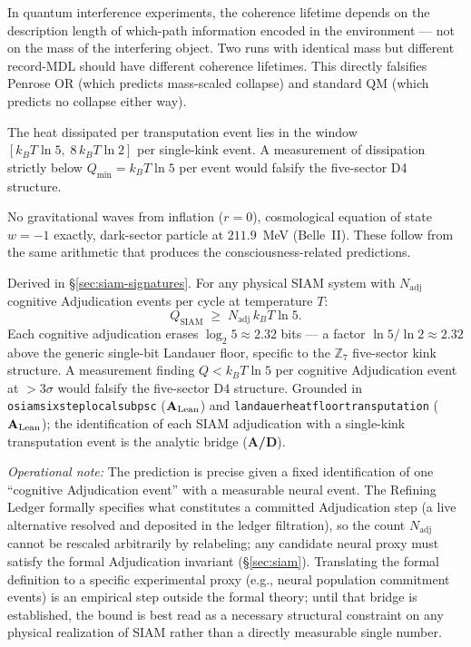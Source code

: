 \documentclass[11pt]{article}
\theoremstyle{remark}
\newcommand{\lean}[1]{%
  \penalty-100
  \begingroup\def\_{\textunderscore\allowbreak}\texttt{#1}\endgroup}
\newcommand{\CatAL}{\ensuremath{\textbf{A}_{\rm Lean}}}
\newcommand{\CatAD}{\textbf{A/D}}
\begin{document}
\medskip
\begin{termlist}
  \item[Coherence lifetime vs.\ MDL record length]
    In quantum interference experiments, the coherence lifetime depends on the
    description length of which-path information encoded in the environment --- not
    on the mass of the interfering object. Two runs with identical mass but different
    record-MDL should have different coherence lifetimes. This directly falsifies
    Penrose OR (which predicts mass-scaled collapse) and standard QM (which predicts
    no collapse either way).

  \item[Transputation dissipation window]
    The heat dissipated per transputation event lies in the window
    $[k_B T \ln 5,\; 8\, k_B T \ln 2]$ per single-kink event. A measurement
    of dissipation strictly below $Q_{\min} = k_B T \ln 5$ per event would
    falsify the five-sector D4 structure.

  \item[Cosmological and particle predictions]
    No gravitational waves from inflation ($r = 0$), cosmological equation of state
    $w = -1$ exactly, dark-sector particle at $211.9$~MeV (Belle~II). These follow
    from the same arithmetic that produces the consciousness-related predictions.

  \item[SIAM aggregate Landauer floor (\CatAD)]
    Derived in \S\ref{sec:siam-signatures}. For any physical SIAM system with
    $N_\text{adj}$ cognitive Adjudication events per cycle at temperature $T$:
    \[
      Q_\text{SIAM} \;\geq\; N_\text{adj}\, k_B T \ln 5.
    \]
    Each cognitive adjudication erases $\log_2 5 \approx 2.32$ bits ---
    a factor $\ln 5 / \ln 2 \approx 2.32$ above the generic single-bit Landauer floor,
    specific to the $\mathbb{Z}_7$ five-sector kink structure.
    A measurement finding $Q < k_B T \ln 5$ per cognitive Adjudication event
    at $>3\sigma$ would falsify the five-sector D4 structure.
    Grounded in \lean{osiam\_six\_step\_local\_subpsc} (\CatAL) and
    \lean{landauer\_heat\_floor\_transputation} (\CatAL); the identification of each
    SIAM adjudication with a single-kink transputation event is the analytic bridge
    (\CatAD).

    \emph{Operational note:} The prediction is precise given a fixed identification of
    one ``cognitive Adjudication event'' with a measurable neural event. The Refining
    Ledger formally specifies what constitutes a committed Adjudication step (a live
    alternative resolved and deposited in the ledger filtration), so the count
    $N_\text{adj}$ cannot be rescaled arbitrarily by relabeling; any candidate neural
    proxy must satisfy the formal Adjudication invariant (\S\ref{sec:siam}).
    Translating the formal definition to a specific experimental proxy (e.g., neural
    population commitment events) is an empirical step outside the formal theory;
    until that bridge is established, the bound is best read as a necessary structural
    constraint on any physical realization of SIAM rather than a directly measurable
    single number.


\end{termlist}
\end{document}
